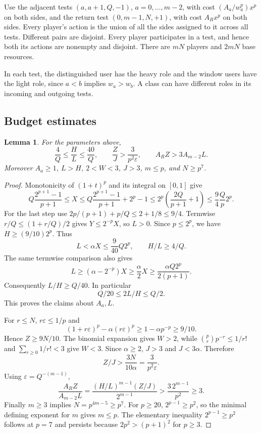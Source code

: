 \documentclass[11pt]{article}
\newtheorem{lemma}[theorem]{Lemma}
\theoremstyle{definition}
\theoremstyle{remark}
\begin{document}
Use the adjacent tests $(a,a+1,Q,-1)$, $a=0,\ldots,m-2$, with cost $(A_a/w_a^p)x^p$ on both sides, and the return test $(0,m-1,N,+1)$, with cost $A_Rx^p$ on both sides. Every player's action is the union of all the sides assigned to it across all tests. Different pairs are disjoint. Every player participates in a test, and hence both its actions are nonempty and disjoint. There are $mN$ players and $2mN$ base resources.

In each test, the distinguished user has the heavy role and the window users have the light role, since $a<b$ implies $w_a>w_b$. A class can have different roles in its incoming and outgoing tests.

\subsection{Budget estimates}
\begin{lemma}\label{lem:scalars}
For the parameters above,
\begin{equation}\label{eq:scalarbounds}
 \frac4Q\le\frac HL\le\frac{40}Q,\qquad
 \frac ZJ>\frac3{p^2\varepsilon},\qquad
 A_RZ>3A_{m-2}L.
\end{equation}
Moreover $A_a\ge1$, $L>H$, $2<W<3$, $J>3$, $m\le p$, and $N\ge p^7$.
\end{lemma}
\begin{proof}
Monotonicity of $(1+t)^p$ and its integral on $[0,1]$ give
\[
 Q\frac{2^{p+1}-1}{p+1}\le X
 \le Q\frac{2^{p+1}-1}{p+1}+2^p-1
 \le 2^p\left(\frac{2Q}{p+1}+1\right)
 \le\frac94\frac Qp2^p.
\]
For the last step use $2p/(p+1)+p/Q\le2+1/8\le9/4$. Termwise $r/Q\le(1+r/Q)/2$ gives $Y\le2^{-p}X$, so $L>0$. Since $p\le2^p$, we have $H\ge(9/10)2^p$. Thus
\[
 L<\alpha X\le\frac9{40}Q2^p,
 \qquad H/L\ge4/Q.
\]
The same termwise comparison also gives
\[
 L\ge(\alpha-2^{-p})X\ge\frac\alpha2X
 \ge\frac{\alpha Q2^p}{2(p+1)}.
\]
Consequently $L/H\ge Q/40$. In particular
\begin{equation}\label{eq:amprange}
 Q/20\le2L/H\le Q/2.
\end{equation}
This proves the claims about $A_a,L$.

For $r\le N$, $r\varepsilon\le1/p$ and
\[
 (1+r\varepsilon)^p-\alpha(r\varepsilon)^p
 \ge1-\alpha p^{-p}\ge9/10.
\]
Hence $Z\ge9N/10$. The binomial expansion gives $W>2$, while $\binom pr p^{-r}\le1/r!$ and $\sum_{r\ge0}1/r!<3$ give $W<3$. Since $\alpha\ge2$, $J>3$ and $J<3\alpha$. Therefore
\[
 Z/J>\frac{3N}{10\alpha}=\frac3{p^2\varepsilon}.
\]
Using $\varepsilon=Q^{-(m-1)}$,
\[
 \frac{A_RZ}{A_{m-2}L}
 =\frac{(H/L)^{m-1}(Z/J)}{2^{m-1}}
 >\frac{3\,2^{m-1}}{p^2}\ge3.
\]
Finally $m\ge3$ implies $N=p^{4m-5}\ge p^7$. For $p\ge20$, $2^{p-1}\ge p^2$, so the minimal defining exponent for $m$ gives $m\le p$. The elementary inequality $2^{p-1}\ge p^2$ follows at $p=7$ and persists because $2p^2>(p+1)^2$ for $p\ge3$.
\end{proof}
\end{document}

